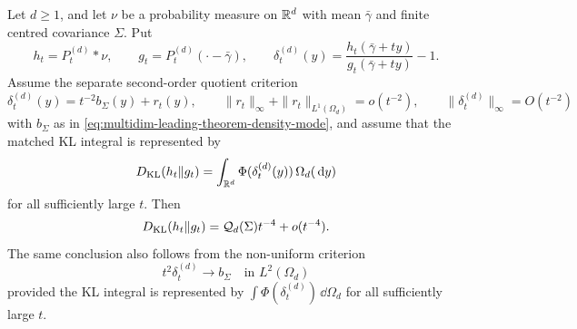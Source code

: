 \begin{theorem}%
\label{thm:second-order-quotient-kl-coefficient}
\label{prop:second-order-quotient-criterion}
Let \(d\ge1\), and let \(\nu\) be a probability measure on \(\mathbb{R}^d\) with
mean \(\bar{\gamma}\) and finite centred covariance \(\Sigma\).  Put
\[
  h_t=P_t^{(d)}*\nu,\qquad
  g_t=P_t^{(d)}(\cdot-\bar{\gamma}),\qquad
  \delta_t^{(d)}(y)=\frac{h_t(\bar{\gamma}+ty)}
  {g_t(\bar{\gamma}+ty)}-1 .
\]
Assume the separate second-order quotient criterion
\begin{equation}\label{eq:second-order-quotient-criterion}
  \delta_t^{(d)}(y)=t^{-2}b_\Sigma(y)+r_t(y),\qquad
  \|r_t\|_\infty+\|r_t\|_{L^1(\Omega_d)}=o(t^{-2}),\qquad
  \|\delta_t^{(d)}\|_\infty=O(t^{-2})
\end{equation}
with \(b_\Sigma\) as in
\eqref{eq:multidim-leading-theorem-density-mode}, and assume that the matched
KL integral is represented by
\[
D_{\rm KL}(h_t\|g_t)
=\int_{\mathbb{R}^d}\Phi(\delta_t^{(d)}(y))\,\Omega_d(\,\mathrm{d} y)
\]
for all sufficiently large \(t\).  Then
\[
D_{\rm KL}(h_t\|g_t)=\mathcal Q_d(\Sigma)t^{-4}+o(t^{-4}).
\]
The same conclusion also follows from the non-uniform criterion
\[
  t^2\delta_t^{(d)}\to b_\Sigma\quad\text{in }L^2(\Omega_d)
\]
provided the KL integral is represented by
\(\int\Phi(\delta_t^{(d)})\,\dd\Omega_d\) for all sufficiently large \(t\).
\end{theorem}

